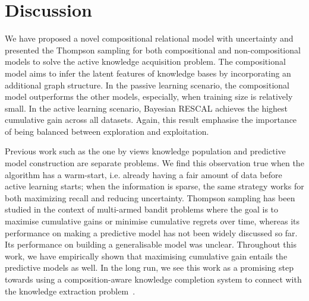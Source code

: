 \section{Discussion}
We have proposed a novel compositional relational model with uncertainty and presented the
Thompson sampling for both compositional and non-compositional models to solve the active knowledge acquisition problem. 
The compositional model aims to infer the latent features of knowledge 
bases by incorporating an additional graph structure. In the passive 
learning scenario, the compositional model outperforms the other models, 
especially, when training size is relatively small. 
In the active learning scenario, Bayesian RESCAL achieves the highest 
cumulative gain across all datasets. Again, this result emphasise the 
importance of being balanced between exploration and exploitation. 

Previous work such as the one by \citet{kajino2015active} 
views knowledge population 
and predictive model construction are separate problems. 
We find this observation true when the algorithm has a warm-start, 
i.e. already having a fair amount of data before active learning starts; 
when the information is sparse, the same strategy works for both maximizing 
recall and reducing uncertainty.  
Thompson sampling has been studied in the context of multi-armed bandit 
problems where the goal is to maximise cumulative gains or minimise cumulative 
regrets over time, whereas its performance on making a predictive model has not 
been widely discussed so far. Its performance on building a generalisable model 
was unclear. Throughout this work, we have empirically shown that maximising 
cumulative gain entails the predictive models as well.
In the long run, we see this work as a promising step towards using a composition-aware knowledge 
completion system to connect with the 
knowledge extraction problem~\cite{dong2014knowledge}. %

